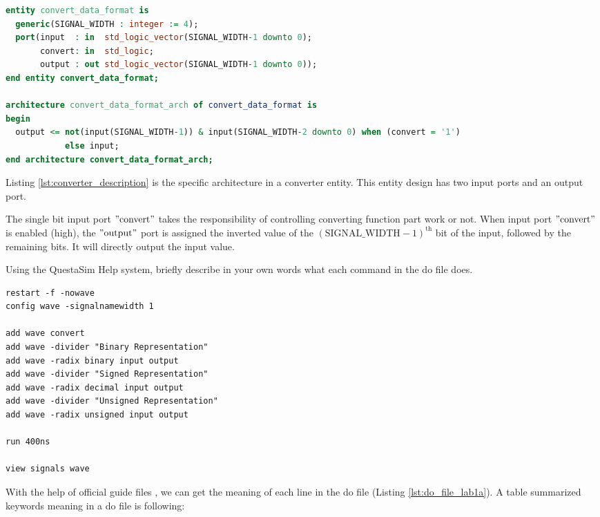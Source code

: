 \documentclass[12pt]{article}
\begin{document}
\begin{lstlisting}[caption={Entity declaration in "convert\_data\_format.vhdl"}, label={lst:converter_description}, language=VHDL]
entity convert_data_format is
  generic(SIGNAL_WIDTH : integer := 4);
  port(input  : in  std_logic_vector(SIGNAL_WIDTH-1 downto 0);
       convert: in  std_logic;
       output : out std_logic_vector(SIGNAL_WIDTH-1 downto 0));
end entity convert_data_format;

architecture convert_data_format_arch of convert_data_format is
begin
  output <= not(input(SIGNAL_WIDTH-1)) & input(SIGNAL_WIDTH-2 downto 0) when (convert = '1')
            else input;
end architecture convert_data_format_arch;
\end{lstlisting}

Listing \ref{lst:converter_description} is the specific architecture in a converter entity.
This entity design has two input ports and an output port.

The single bit input port \("\text{convert}"\) takes the responsibility of controlling converting function part work or not.
When input port \("\text{convert}"\) is enabled (high), the \("\text{output}"\) port is assigned the inverted value of the \((\text{SIGNAL\_WIDTH}-1)^{\text{th}}\) bit of the input, followed by the remaining bits.
It will directly output the input value.

\begin{questionbox}
Using the QuestaSim Help system, briefly describe in your own words what each command in the do file does.
\end{questionbox}

\begin{lstlisting}[caption={convert\_data\_format\_tb.do File}, label={lst:do_file_lab1a}, language=questasim]
restart -f -nowave
config wave -signalnamewidth 1

add wave convert
add wave -divider "Binary Representation"
add wave -radix binary input output
add wave -divider "Signed Representation"
add wave -radix decimal input output
add wave -divider "Unsigned Representation"
add wave -radix unsigned input output

run 400ns

view signals wave
\end{lstlisting}

With the help of official guide files \cite{Questasim_help_system}, we can get the meaning of each line in the do file (Listing \ref{lst:do_file_lab1a}).
A table summarized keywords meaning in a do file is following:
\end{document}
